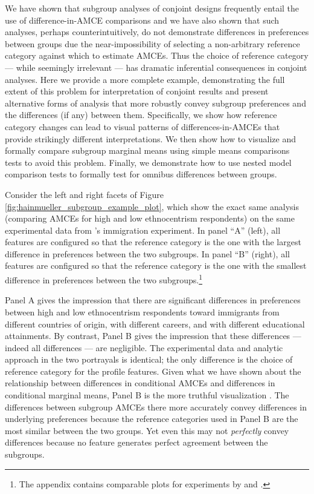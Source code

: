 \documentclass[a4paper,12pt]{article}\usepackage[]{graphicx}\usepackage[]{color}
\begin{document}
We have shown that subgroup analyses of conjoint designs frequently entail the use of difference-in-AMCE comparisons and we have also shown that such analyses, perhaps counterintuitively, do not demonstrate differences in preferences between groups due the near-impossibility of selecting a non-arbitrary reference category against which to estimate AMCEs. Thus the choice of reference category --- while seemingly irrelevant --- has dramatic inferential consequences in conjoint analyses. Here we provide a more complete example, demonstrating the full extent of this problem for interpretation of conjoint results and present alternative forms of analysis that more robustly convey subgroup preferences and the differences (if any) between them. Specifically, we show how reference category changes can lead to visual patterns of differences-in-AMCEs that provide strikingly different interpretations. We then show how to visualize and formally compare subgroup marginal means using simple means comparisons tests to avoid this problem. Finally, we demonstrate how to use nested model comparison tests to formally test for omnibus differences between groups.

Consider the left and right facets of Figure \ref{fig:hainmueller_subgroup_example_plot}, which show the exact same analysis (comparing AMCEs for high and low ethnocentrism respondents) on the same experimental data from \citeauthor{HainmuellerHopkinsYamamoto2014}'s immigration experiment. In panel ``A'' (left), all features are configured so that the reference category is the one with the largest difference in preferences between the two subgroups. In panel ``B'' (right), all features are configured so that the reference category is the one with the smallest difference in preferences between the two subgroups.\footnote{The appendix contains comparable plots for experiments by \citet{BallardRosaMartinScheve2016} and \citet{TeeleKallaRosenbluth2018}.}

Panel A gives the impression that there are significant differences in preferences between high and low ethnocentrism respondents toward immigrants from different countries of origin, with different careers, and with different educational attainments. By contrast, Panel B gives the impression that these differences --- indeed all differences --- are negligible. The experimental data and analytic approach in the two portrayals is identical; the only difference is the choice of reference category for the profile features. Given what we have shown about the relationship between differences in conditional AMCEs and differences in conditional marginal means, Panel B is the more truthful visualization \citep{Cairo2016}. The differences between subgroup AMCEs there more accurately convey differences in underlying preferences because the reference categories used in Panel B are the most similar between the two groups. Yet even this may not \textit{perfectly} convey differences because no feature generates perfect agreement between the subgroups.
\end{document}
